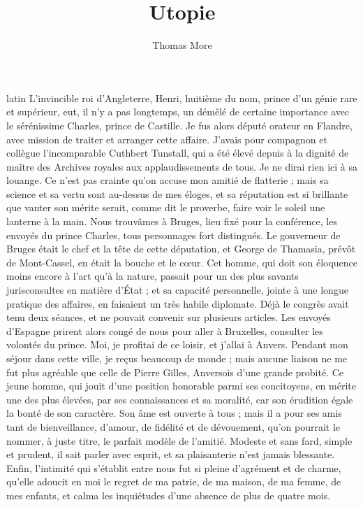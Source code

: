 \documentclass[12pt,a4paper]{book}
\renewenvironment{latin}
    	{\begin{hyphenrules}{latin}}
    	{\end{hyphenrules}}
\begin{document}
\author{Thomas More}
\title{Utopie}
\date{}

\maketitle


\begin{pairs}
    \begin{Leftside} 
    \begin{latin}
    \beginnumbering
        \pstart
        L'invincible roi d'Angleterre, Henri, huitième du nom, prince d'un génie rare et supérieur, eut, il n'y a pas longtemps, un démêlé de certaine importance avec le sérénissime Charles, prince de Castille. Je fus alors député orateur en Flandre, avec mission de traiter et arranger cette affaire. J'avais pour compagnon et collègue l'incomparable Cuthbert Tunstall, qui a été élevé depuis à la dignité de maître des Archives royales aux applaudissements de tous. Je ne dirai rien ici à sa louange. Ce n'est pas crainte qu'on accuse mon amitié de flatterie ; mais sa science et sa vertu sont au-dessus de mes éloges, et sa réputation est si brillante que vanter son mérite serait, comme dit le proverbe, faire voir le soleil une lanterne à la main.
		\pend
		\pstart
        Nous trouvâmes à Bruges, lieu fixé pour la conférence, les envoyés du prince Charles, tous personnages fort distingués. Le gouverneur de Bruges était le chef et la tête de cette députation, et George de Thamasia, prévôt de Mont-Cassel, en était la bouche et le cœur. Cet homme, qui doit son éloquence moins encore à l'art qu'à la nature, passait pour un des plus savants jurisconsultes en matière d'État ; et sa capacité personnelle, jointe à une longue pratique des affaires, en faisaient un très habile diplomate. Déjà le congrès avait tenu deux séances, et ne pouvait convenir sur plusieurs articles. Les envoyés d'Espagne prirent alors congé de nous pour aller à Bruxelles, consulter les volontés du prince. 
        \pend
		\pstart
        Moi, je profitai de ce loisir, et j'allai à Anvers. Pendant mon séjour dans cette ville, je reçus beaucoup de monde ; mais aucune liaison ne me fut plus agréable que celle de Pierre Gilles, Anversois d'une grande probité. Ce jeune homme, qui jouit d'une position honorable parmi ses concitoyens, en mérite une des plus élevées, par ses connaissances et sa moralité, car son érudition égale la bonté de son caractère. Son âme est ouverte à tous ; mais il a pour ses amis tant de bienveillance, d'amour, de fidélité et de dévouement, qu'on pourrait le nommer, à juste titre, le parfait modèle de l'amitié. Modeste et sans fard, simple et prudent, il sait parler avec esprit, et sa plaisanterie n'est jamais blessante. Enfin, l'intimité qui s'établit entre nous fut si pleine d'agrément et de charme, qu'elle adoucit en moi le regret de ma patrie, de ma maison, de ma femme, de mes enfants, et calma les inquiétudes d'une absence de plus de quatre mois. 

\end{latin}
\end{Leftside}
\end{pairs}
\end{document}
